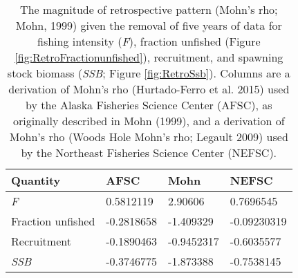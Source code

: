 
\begin{longtable}[t]{llll}
\caption{\label{tab:RetroMohnsrho}The magnitude of retrospective pattern (Mohn's rho; Mohn, 1999) given the removal of five years of data for fishing intensity (\emph{F}), fraction unfished (Figure \ref{fig:RetroFractionunfished}),  recruitment, and spawning stock biomass (\emph{SSB}; Figure \ref{fig:RetroSsb}). Columns are a derivation of Mohn's rho (Hurtado-Ferro et al. 2015) used by the Alaska Fisheries Science Center (AFSC), as originally described in Mohn (1999), and a derivation of Mohn's rho (Woods Hole Mohn's rho; Legault 2009) used by the Northeast Fisheries Science Center (NEFSC).}\\
\toprule
Quantity & AFSC & Mohn & NEFSC\\
\midrule
\emph{F} & 0.5812119 & 2.90606 & 0.7696545\\
Fraction unfished & -0.2818658 & -1.409329 & -0.09230319\\
Recruitment & -0.1890463 & -0.9452317 & -0.6035577\\
\emph{SSB} & -0.3746775 & -1.873388 & -0.7538145\\
\bottomrule
\end{longtable}
